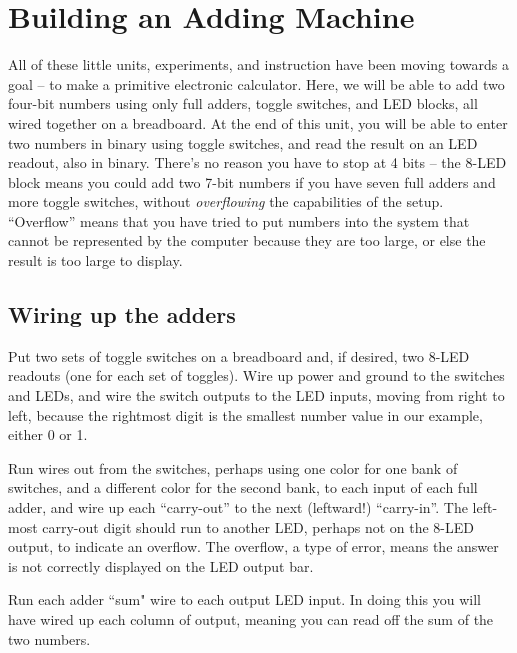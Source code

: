 \section{Building an Adding Machine}
All of these little units, experiments, and instruction have been moving towards a goal -- to make a primitive electronic calculator. Here, we will be able to add two four-bit numbers using only full adders, toggle switches, and LED blocks, all wired together on a breadboard. At the end of this unit, you will be able to enter two numbers in binary using toggle switches, and read the result on an LED readout, also in binary. There's no reason you have to stop at 4 bits -- the 8-LED block means you could add two 7-bit numbers if you have seven full adders and more toggle switches, without \emph{overflowing} the capabilities of the setup. ``Overflow'' means that you have tried to put numbers into the system that cannot be represented by the computer because they are too large, or else the result is too large to display. 

\subsection*{Wiring up the adders}

Put two sets of toggle switches on a breadboard and, if desired, two 8-LED readouts (one for each set of toggles). Wire up power and ground to the switches and LEDs, and wire the switch outputs to the LED inputs, moving from right to left, because the rightmost digit is the smallest number value in our example, either 0 or 1.

Run wires out from the switches, perhaps using one color for one bank of switches, and a different color for the second bank, to each input of each full adder, and wire up each ``carry-out'' to the next (leftward!) ``carry-in''. The left-most carry-out digit should run to another LED, perhaps not on the 8-LED output, to indicate an overflow. The overflow, a type of error, means the answer is not correctly displayed on the LED output bar.

Run each adder ``sum" wire to each output LED input. In doing this you will have wired up each column of output, meaning you can read off the sum of the two numbers.
